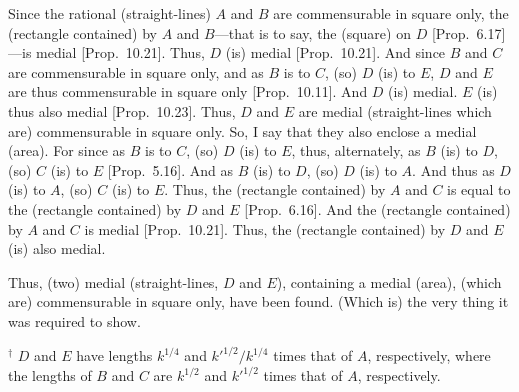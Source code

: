 \begin{Parallel}{}{}
{Since the rational (straight-lines) $A$ and $B$ are commensurable in square only, the (rectangle contained) by $A$ and $B$---that is to say, the
(square) on $D$ [Prop.~6.17]---is medial
[Prop.~10.21]. Thus, $D$ (is) medial [Prop.~10.21]. And
since $B$ and $C$ are commensurable in square only, and as $B$ is to $C$, (so) $D$ (is) to $E$, $D$ and $E$ are thus commensurable in square
only [Prop.~10.11]. And $D$ (is) medial.
$E$ (is) thus also medial [Prop.~10.23].
Thus, $D$ and $E$ are medial (straight-lines which are) commensurable
in square only. So, I say that they also enclose a medial (area). For since
as $B$ is to $C$, (so) $D$ (is) to $E$, thus, alternately, as $B$ (is) to $D$,
(so) $C$ (is) to $E$ [Prop.~5.16]. And as
$B$ (is) to $D$, (so) $D$ (is) to $A$. And thus as $D$ (is) to $A$, (so)
$C$ (is) to $E$. Thus, the (rectangle contained) by $A$ and $C$ is equal
to the (rectangle contained) by $D$ and $E$ [Prop.~6.16]. And the (rectangle contained) by 
$A$ and $C$ is medial [Prop.~10.21]. Thus, the (rectangle contained) by $D$ and $E$ (is)
also medial.

Thus, (two) medial (straight-lines, $D$ and $E$), containing a medial (area),
(which are) commensurable in square only, have been found. (Which is)
the very thing it was required to show.}
\end{Parallel}
{\footnotesize\noindent$^\dag$ $D$ and $E$ have lengths $k^{1/4}$ and $k'^{1/2}/k^{1/4}$ times that of $A$, respectively, where the lengths of $B$ and $C$ are
$k^{1/2}$ and $k'^{1/2}$ times that of $A$, respectively.}

